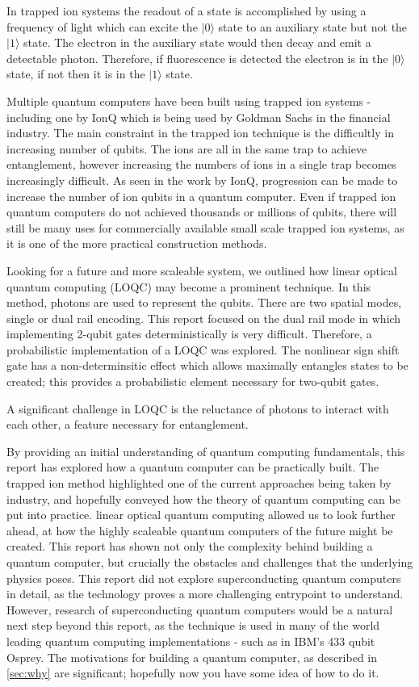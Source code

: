 In trapped ion systems the readout of a state is accomplished by using a frequency of light which can excite the $|0\rangle$ state to an auxiliary state but not the $|1\rangle$ state. The electron in the auxiliary state would then decay and emit a detectable photon. Therefore, if fluorescence is detected the electron is in the $|0\rangle $ state, if not then it is in the $|1\rangle$ state. 

Multiple quantum computers have been built using trapped ion systems - including one by IonQ which is being used by Goldman Sachs in the financial industry. \cite{noauthor_goldman_2021} 
The main constraint in the trapped ion technique is the difficultly in increasing number of qubits. The ions are all in the same trap to achieve entanglement, however increasing the numbers of ions in a single trap becomes increasingly difficult. As seen in the work by IonQ, progression can be made to increase the number of ion qubits in a quantum computer. Even if trapped ion quantum computers do not achieved thousands or millions of qubits, there will still be many uses for commercially available small scale trapped ion systems, as it is one of the more practical construction methods.

Looking for a future and more scaleable system, we outlined how linear optical quantum computing (LOQC) may become a prominent technique. In this method, photons are used to represent the qubits. There are two spatial modes, single or dual rail encoding. This report focused on the dual rail mode in which implementing 2-qubit gates deterministically is very difficult. Therefore, a probabilistic implementation of a LOQC was explored. The nonlinear sign shift gate has a non-determinsitic effect which allows maximally entangles states to be created; this provides a probabilistic element necessary for two-qubit gates.

A significant challenge in LOQC is the reluctance of photons to interact with each other, a feature necessary for entanglement.

By providing an initial understanding of quantum computing fundamentals, this report has explored how a quantum computer can be practically built. The trapped ion method highlighted one of the current approaches being taken by industry, and hopefully conveyed how the theory of quantum computing can be put into practice. linear optical quantum computing allowed us to look further ahead, at how the highly scaleable quantum computers of the future might be created. This report has shown not only the complexity behind building a quantum computer, but crucially the obstacles and challenges that the underlying physics poses. This report did not explore superconducting quantum computers in detail, as the technology proves a more challenging entrypoint to understand. However, research of superconducting quantum computers would be a natural next step beyond this report, as the technique is used in many of the world leading quantum computing implementations - such as in IBM's 433 qubit Osprey. The motivations for building a quantum computer, as described in \cref{sec:why} are significant; hopefully now you have some idea of how to do it.